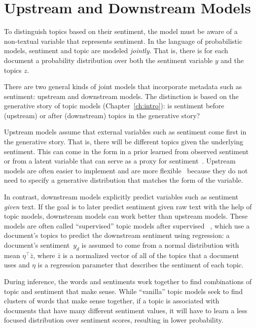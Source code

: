 
\section{Upstream and Downstream Models}

To distinguish topics based on their sentiment, the model must be
aware of a non-textual variable that represents sentiment.
In the language of probabilistic models,
sentiment and topic are modeled \emph{jointly}.  That is, there is for each document a
probability distribution over both the sentiment variable $y$ and
the topics $z$.

There are two general kinds of joint models that incorporate metadata
such as sentiment: upstream and downstream models.  The distinction is
based on the generative story of topic models (Chapter~\ref{ch:intro}): is
sentiment before (upstream) or after (downstream) topics in the
generative story?


Upstream models assume that external variables such as sentiment come first in the generative
story.  That is, there will be different topics given the underlying
sentiment.  This can come in the form in a prior learned from observed
sentiment~\citep{mimno-08} or from a latent variable that can serve as
a proxy for sentiment~\citep{lin-09}.  Upstream models are often
easier to implement and are more flexible~\citep{stewart-14} because they do not need to specify a generative distribution that matches the form of the variable.

In contrast, downstream models explicitly predict variables such as sentiment
\emph{given} text.  If the goal is to later predict sentiment given
raw text with the help of topic models, downstream models can work
better than upstream models.  These models are often called
``supervised'' topic models after supervised
~\citep{blei-07b}, which use a document's topics to predict
the downstream sentiment using regression: a document's sentiment~$y_d$ is
assumed to come from a normal distribution with mean $\eta^\top \bar
z$, where $\bar z$ is a normalized vector of all of the topics that a
document uses and $\eta$ is a regression parameter that describes the
sentiment of each topic.

During inference, the words and sentiments work together to find
combinations of topic and sentiment that make sense.  While
``vanilla'' topic models seek to find clusters of words that make
sense together, if a topic is associated with documents that have many
different sentiment values, it will have to learn a less focused distribution over
sentiment scores, resulting in lower probability.  

